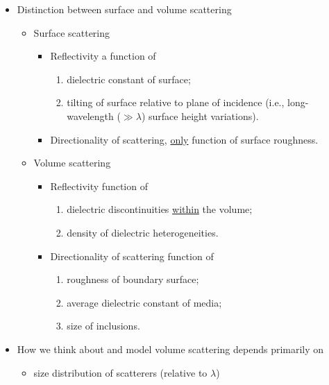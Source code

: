 \documentclass[11pt, oneside]{article}
\begin{document}
\begin{itemize}
	\item Distinction between surface and volume scattering
	\begin{itemize}
		\item Surface scattering
		\begin{itemize}
			\item Reflectivity a function of
			\begin{enumerate}
				\item dielectric constant of surface;
				\item tilting of surface relative to plane of incidence (i.e., long-wavelength ($\gg\lambda$) surface height variations).
			\end{enumerate}
			\item Directionality of scattering, \underline{only} function of surface roughness.
		\end{itemize}
		\item Volume scattering
		\begin{itemize}
			\item Reflectivity function of
			\begin{enumerate}
				\item dielectric discontinuities \underline{within} the volume;
				\item density of dielectric heterogeneities.
			\end{enumerate}
			\item Directionality of scattering function of
			\begin{enumerate}
				\item roughness of boundary surface;
				\item average dielectric constant of media;
				\item size of inclusions.
			\end{enumerate}
		\end{itemize}
	\end{itemize}
	\item How we think about and model volume scattering depends primarily on
	\begin{itemize}
		\item size distribution of scatterers (relative to $\lambda$)

\end{itemize}
\end{itemize}
\end{document}
